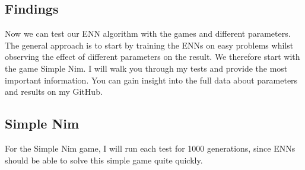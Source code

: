 \documentclass[11pt]{report}
\begin{document}
\begin{enumerate}
    \section{Findings}\label{sec:first-findings}
    Now we can test our ENN algorithm with the games and different parameters.
    The general approach is to start by training the ENNs on easy problems whilst observing the effect of different parameters on the result.
    We therefore start with the game Simple Nim.
    I will walk you through my tests and provide the most important information.
    You can gain insight into the full data about parameters and results on my GitHub.
            \subsection{Simple Nim}\label{subsec:simple-nim-results}
    For the Simple Nim game, I will run each test for 1000 generations, since ENNs should be able to solve this simple game quite quickly.

\end{enumerate}
\end{document}
